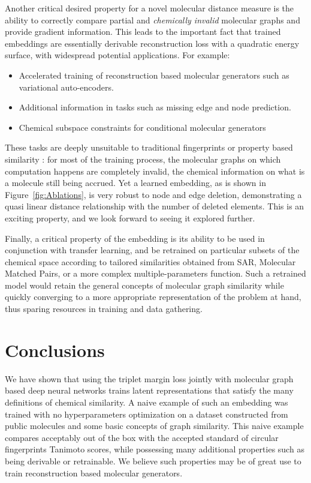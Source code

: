 \documentclass[doublespacing]{bmcart}
\begin{document}
Another critical desired property for a novel molecular distance measure is the ability to correctly compare partial and \emph{chemically invalid} molecular graphs and provide gradient information. This leads to the important fact that trained embeddings are essentially derivable reconstruction loss with a quadratic energy surface, with widespread potential applications. For example:
\begin{itemize}
\item Accelerated training of reconstruction based molecular generators such as variational auto-encoders.
\item Additional information in tasks such as missing edge and node prediction.
\item Chemical subspace constraints for conditional molecular generators
\end{itemize}
These tasks are deeply unsuitable to traditional fingerprints or property based similarity : for most of the training process, the molecular graphs on which computation happens are completely invalid, the chemical information on what is a molecule still being accrued. Yet a learned embedding, as is shown in Figure~\ref{fig:Ablations}, is very robust to node and edge deletion, demonstrating a quasi linear distance relationship with the number of deleted elements. This is an exciting property, and we look forward to seeing it explored further.



Finally, a critical property of the embedding is its ability to be used in conjunction with transfer learning\cite{tan2018survey, weiss2016survey}, and be retrained on particular subsets of the chemical space according to tailored similarities obtained from SAR, Molecular Matched Pairs\cite{griffen2011matched}, or a more complex multiple-parameters function. Such a retrained model would retain the general concepts of molecular graph similarity while quickly converging to a more appropriate representation of the problem at hand, thus sparing resources in training and data gathering.

\section*{Conclusions}
We have shown that using the triplet margin loss jointly with molecular graph based deep neural networks trains latent representations that satisfy the many definitions of chemical similarity. A naive example of such an embedding was trained with no hyperparameters optimization on a dataset constructed from public molecules and some basic concepts of graph similarity. This naive example compares acceptably out of the box with the accepted standard of circular fingerprints Tanimoto scores, while possessing many additional properties such as being derivable or retrainable. We believe such properties may be of great use to train reconstruction based molecular generators. 
\end{document}
